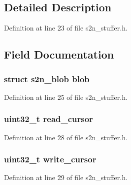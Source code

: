 \subsection{Detailed Description}


Definition at line 23 of file s2n\+\_\+stuffer.\+h.



\subsection{Field Documentation}
\subsubsection[{\texorpdfstring{blob}{blob}}]{\setlength{\rightskip}{0pt plus 5cm}struct {\bf s2n\+\_\+blob} blob}\hypertarget{structs2n__stuffer_ab95f00f583f1cb41ae00918e9ea180c9}{}\label{structs2n__stuffer_ab95f00f583f1cb41ae00918e9ea180c9}


Definition at line 25 of file s2n\+\_\+stuffer.\+h.

\subsubsection[{\texorpdfstring{read\+\_\+cursor}{read_cursor}}]{\setlength{\rightskip}{0pt plus 5cm}uint32\+\_\+t read\+\_\+cursor}\hypertarget{structs2n__stuffer_a5d643ee7dd6cd0eba779a284dce4a3f6}{}\label{structs2n__stuffer_a5d643ee7dd6cd0eba779a284dce4a3f6}


Definition at line 28 of file s2n\+\_\+stuffer.\+h.

\subsubsection[{\texorpdfstring{write\+\_\+cursor}{write_cursor}}]{\setlength{\rightskip}{0pt plus 5cm}uint32\+\_\+t write\+\_\+cursor}\hypertarget{structs2n__stuffer_a19d9286958de6627ef95be4d9b9b3d1a}{}\label{structs2n__stuffer_a19d9286958de6627ef95be4d9b9b3d1a}


Definition at line 29 of file s2n\+\_\+stuffer.\+h.

